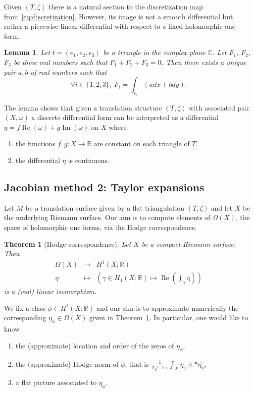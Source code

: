 \documentclass[a4paper,12pt]{article}
\def\bC{\mathbb{C}}
\def\bR{\mathbb{R}}
\def\Re{\operatorname{Re}}
\def\Im{\operatorname{Im}}
\newtheorem{lemma}[definition]{Lemma}
\newtheorem{theorem}[definition]{Theorem}
\begin{document}
Given $(T, \zeta)$ there is a natural section to the discretization map
from~\eqref{eq:discretization}. However, its image is not a smooth
differential but rather a piecewise linear differential with respect to a fixed
holomorphic one form.
\begin{lemma}
Let $t = (e_1, e_2, e_3)$ be a triangle in the complex plane $\bC$.
Let $F_1$, $F_2$, $F_3$ be three real numbers such that $F_1 + F_2 + F_3 = 0$.
Then there exists a unique pair $a,b$ of real numbers such that 
\[
\forall i \in \{1,2,3\},\ F_i = \int_{e_i} (a dx + b dy).
\]
\end{lemma}

The lemma shows that given a translation structure $(T, \zeta)$ with
associated pair $(X, \omega)$ a discrete differential form can
be interpreted as a differential
$\eta = f \Re(\omega) + g \Im(\omega)$ on $X$ where
\begin{enumerate}
\item the functions $f, g: X \to \bR$ are constant on each triangle of $T$,
\item the differential $\eta$ is continuous.
\end{enumerate}


\subsection{Jacobian method 2: Taylor expansions}
Let $M$ be a translation surface given by a flat triangulation $(T, \zeta)$
and let $X$ be the underlying Riemann surface. Our aim is to compute
elements of $\Omega(X)$, the space of holomorphic one forms, via the Hodge correspondence.

\begin{theorem}[Hodge correspondence]
\label{thm:HodgeCorrespondence}
Let $X$ be a compact Riemann surface. Then
\[
\begin{array}{lll}
\Omega(X) & \to & H^1(X; \bR) \\
\eta & \mapsto & \left( \gamma \in H_1(X; \bR) \mapsto \Re(\int_\gamma \eta) \right)
\end{array}
\]
is a (real) linear isomorphism.
\end{theorem}

We fix a class $\phi \in H^1(X; \bR)$ and our aim is to approximate numerically
the corresponding $\eta_\phi \in \Omega(X)$ given in Theorem~\ref{thm:HodgeCorrespondence}.
In particular, one would like to know
\begin{enumerate}
\item the (approximate) location and order of the zeros of $\eta_\phi$,
\item the (approximate) Hodge norm of $\phi$, that is $\frac{1}{2 \sqrt{-1} \pi} \int_X \eta_\phi \wedge * \overline{\eta_\phi}$,
\item a flat picture associated to $\eta_\phi$.
\end{enumerate}
\end{document}
